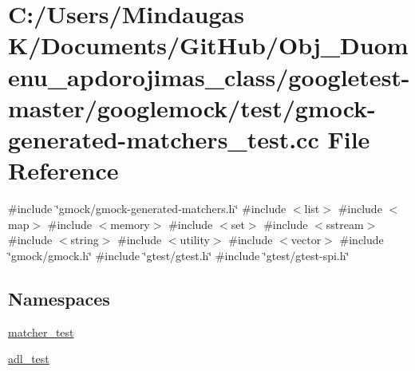 \hypertarget{googletest-master_2googlemock_2test_2gmock-generated-matchers__test_8cc}{}\section{C\+:/\+Users/\+Mindaugas K/\+Documents/\+Git\+Hub/\+Obj\+\_\+\+Duomenu\+\_\+apdorojimas\+\_\+class/googletest-\/master/googlemock/test/gmock-\/generated-\/matchers\+\_\+test.cc File Reference}
\label{googletest-master_2googlemock_2test_2gmock-generated-matchers__test_8cc}
{\ttfamily \#include \char`\"{}gmock/gmock-\/generated-\/matchers.\+h\char`\"{}}\newline
{\ttfamily \#include $<$list$>$}\newline
{\ttfamily \#include $<$map$>$}\newline
{\ttfamily \#include $<$memory$>$}\newline
{\ttfamily \#include $<$set$>$}\newline
{\ttfamily \#include $<$sstream$>$}\newline
{\ttfamily \#include $<$string$>$}\newline
{\ttfamily \#include $<$utility$>$}\newline
{\ttfamily \#include $<$vector$>$}\newline
{\ttfamily \#include \char`\"{}gmock/gmock.\+h\char`\"{}}\newline
{\ttfamily \#include \char`\"{}gtest/gtest.\+h\char`\"{}}\newline
{\ttfamily \#include \char`\"{}gtest/gtest-\/spi.\+h\char`\"{}}\newline
\subsection*{Namespaces}
\begin{DoxyCompactItemize}
\item 
 \mbox{\hyperlink{namespacematcher__test}{matcher\+\_\+test}}
\item 
 \mbox{\hyperlink{namespaceadl__test}{adl\+\_\+test}}
\end{DoxyCompactItemize}
